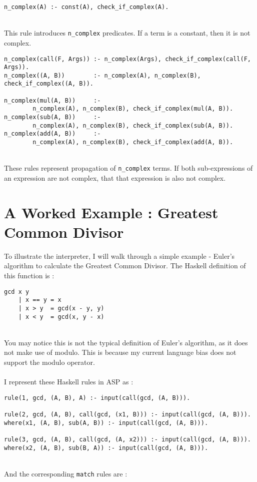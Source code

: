\begin{lstlisting}
n_complex(A) :- const(A), check_if_complex(A).
\end{lstlisting}
\mbox{} \\
This rule introduces \lstinline{n_complex} predicates. If a term is a constant, then it is not complex. \\ %

\begin{lstlisting}
n_complex(call(F, Args)) :- n_complex(Args), check_if_complex(call(F, Args)).
n_complex((A, B))        :- n_complex(A), n_complex(B), check_if_complex((A, B)).

n_complex(mul(A, B))     :- 
		n_complex(A), n_complex(B), check_if_complex(mul(A, B)).
n_complex(sub(A, B))     :- 
		n_complex(A), n_complex(B), check_if_complex(sub(A, B)).
n_complex(add(A, B))     :- 
		n_complex(A), n_complex(B), check_if_complex(add(A, B)).
\end{lstlisting}
\mbox{} \\
These rules represent propagation of \lstinline{n_complex} terms. If both sub-expressions of an expression are not complex, that that expression is also not complex. \\ %

\pagebreak

\section{A Worked Example : Greatest Common Divisor}

To illustrate the interpreter, I will walk through a simple example - Euler's algorithm to calculate the Greatest Common Divisor. The Haskell definition of this function is : \\

\begin{lstlisting}
gcd x y
	| x == y = x
	| x > y  = gcd(x - y, y)
	| x < y  = gcd(x, y - x)
\end{lstlisting}
\mbox{} \\
You may notice this is not the typical definition of Euler's algorithm, as it does not make use of modulo. This is because my current language bias does not support the modulo operator. \\ \\
I represent these Haskell rules in ASP as :\\

\begin{lstlisting}
rule(1, gcd, (A, B), A) :- input(call(gcd, (A, B))).

rule(2, gcd, (A, B), call(gcd, (x1, B))) :- input(call(gcd, (A, B))).
where(x1, (A, B), sub(A, B)) :- input(call(gcd, (A, B))).

rule(3, gcd, (A, B), call(gcd, (A, x2))) :- input(call(gcd, (A, B))).
where(x2, (A, B), sub(B, A)) :- input(call(gcd, (A, B))).
\end{lstlisting}
\mbox{} \\
And the corresponding \lstinline{match} rules are :\\ %


